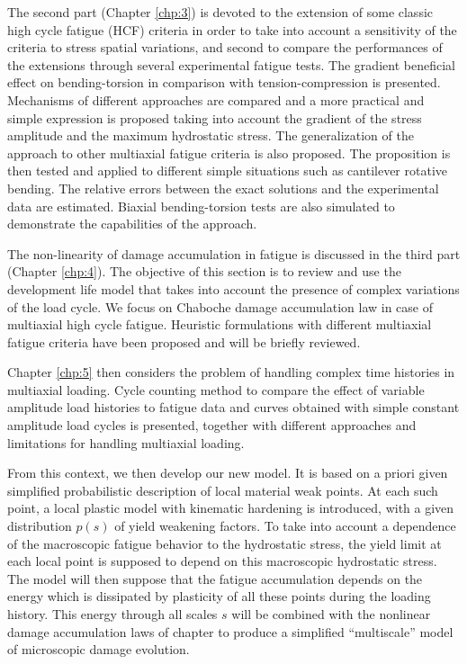 The second part (Chapter \ref{chp:3}) is devoted to the extension of some classic high cycle fatigue (HCF) criteria in order  to take into account a sensitivity of the criteria to stress spatial variations, and second to compare the performances of the extensions through several experimental fatigue tests. The gradient beneficial effect on bending-torsion in comparison with tension-compression is presented. Mechanisms of different approaches are compared and a more practical and simple expression is proposed taking into account the gradient of the stress amplitude and the maximum hydrostatic stress. The generalization of the approach to other multiaxial fatigue criteria is also proposed.  The proposition is then tested and applied to different simple situations such as cantilever rotative bending. The relative errors between the exact solutions and the experimental data are estimated. Biaxial  bending-torsion tests are also simulated to demonstrate the capabilities of the approach. 

The non-linearity of damage accumulation in fatigue is discussed in the third part (Chapter \ref{chp:4}). The objective of this section is to review and use the development life model that takes into account the presence of complex variations of the load cycle. We focus on Chaboche damage accumulation law in case of multiaxial high cycle fatigue. Heuristic formulations with different multiaxial fatigue criteria have been proposed and will be briefly reviewed.

Chapter \ref{chp:5} then considers the problem of handling complex time histories in multiaxial loading. 
Cycle counting method to compare the effect of variable amplitude load histories to fatigue data and curves obtained with simple constant amplitude load cycles is presented, together with different approaches and limitations for handling multiaxial loading.

From this context, we then develop our new model. It is based on a priori given simplified probabilistic description of local material weak points. At each such point, a local plastic model with kinematic hardening is introduced, with a given distribution $p(s)$ of yield weakening factors. To take into account a dependence of the macroscopic fatigue behavior to the hydrostatic stress, the yield limit at each local point is supposed to depend on this macroscopic hydrostatic stress. The model will then suppose that the fatigue accumulation depends on the energy which is dissipated by plasticity of all these points during the loading history.  This energy through all scales $s$ will be combined with the nonlinear damage accumulation laws of chapter \cite{chp:4} to produce a simplified ``multiscale'' model of microscopic damage evolution.

